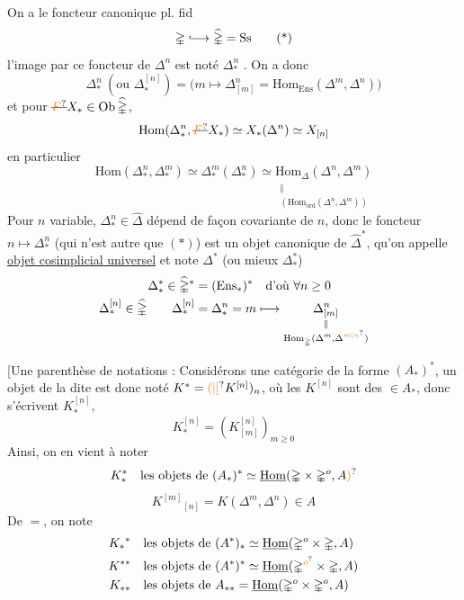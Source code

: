On a le foncteur canonique pl. fid
\[
 \mathbb{\Delta}\lhook\joinrel\longrightarrow\widehat{\mathbb{\Delta}}=\mathrm{Ss}\tag*{(*)}
\]
l'image par ce foncteur de $\Delta^n$ est noté $\Delta^n_*$ . On a donc
\[
 \Delta^n_*\ (\text{ou }\Delta^{[n]}_*)=
 \bigl(m\longmapsto\Delta^n_{[m]}=\mathrm{Hom}_{\mathrm{Ens}}(\Delta^m,\Delta^n)\bigr)
\]
et pour $\deleted{\unsure{F}}X_*\in\mathrm{Ob}\,\widehat{\mathbb{\Delta}}$,
\[
 \mathrm{Hom}(\Delta^n_*,\deleted{\unsure{F}}X_*)\simeq X_*(\Delta^n)\simeq X_{[n]}
\]
en particulier
\[
 \mathrm{Hom}(\Delta^n_*,\Delta^m_*)\simeq\Delta^m_*(\Delta^n_*)\simeq
 \underset{\substack{\Vert\\(\mathrm{Hom}_{\mathrm{ord}}(\Delta^n,\Delta^m))}}{\mathrm{Hom}_{\mathbb{\Delta}}(\Delta^n,\Delta^m)}
\]
Pour $n$ variable, $\Delta^n_*\in\widehat{\mathbb{\Delta}}$ dépend de façon covariante de $n$,  donc le foncteur $n\longmapsto\Delta^n_*$ (qui n'est autre que $(*)$) est un objet canonique de $\widehat{\mathbb{\Delta}}^*$, qu'on appelle \uline{objet cosimplicial universel} et note $\Delta^*$ (ou mieux $\Delta^*_* $)
\[
 \begin{aligned}
 \Delta^*_*\in\widehat{\mathbb{\Delta}}^* &=(\mathrm{Ens}_*)^*
 \quad\text{d'où }\forall n\geq0\\
 \Delta^{[n]}_*\in\widehat{\mathbb{\Delta}} \qquad
 \Delta^{[n]}_*&=\Delta^n_* =m\longmapsto
 \underset{\substack{\Vert\\\mathrm{Hom}_{\mathbb{\Delta}}(\Delta^m,\Delta^{\unsure{m|n}})}}{\Delta^n_{[m]}}
 \end{aligned}
\]

 [Une parenthèse de notations : Considérons une catégorie de la forme $(A_*)^*$, un objet de la dite est donc noté $K^*=\unsure{(|[}K^{[n]})_n$, où les $K^{[n]}$ sont des $\in A_*$, donc s'écrivent $K^{[n]}_*$,
\[
 K^{[n]}_*=(K^{[n]}_{[m]})_{m\geq0}
\]
Ainsi, on en vient à noter
\[
 K^*_*\quad\text{les objets de }(A_*)^*\simeq
 \underline{\mathrm{Hom}}(\mathbb{\Delta}\times\mathbb{\Delta}^o,A\unsure{)}
\]
\[
 K^{[m]}{}_{[n]}=K(\Delta^m,\Delta^n)\in A
\]
De $=$, on note
\[
 \begin{aligned}
 K_*{}^*&\quad\text{les objets de }(A^*)_*\simeq\underline{\mathrm{Hom}}(\mathbb{\Delta}^o\times\mathbb{\Delta},A)\\
 K^{**}&\quad\text{les objets de }(A^*)^*\simeq\underline{\mathrm{Hom}}(\mathbb{\Delta}^{\unsure{o}}\times\mathbb{\Delta},A)\\
 K_{**}&\quad\text{les objets de }A_{**}=\underline{\mathrm{Hom}}(\mathbb{\Delta}^o\times\mathbb{\Delta}^o,A)
 \end{aligned}
\]

